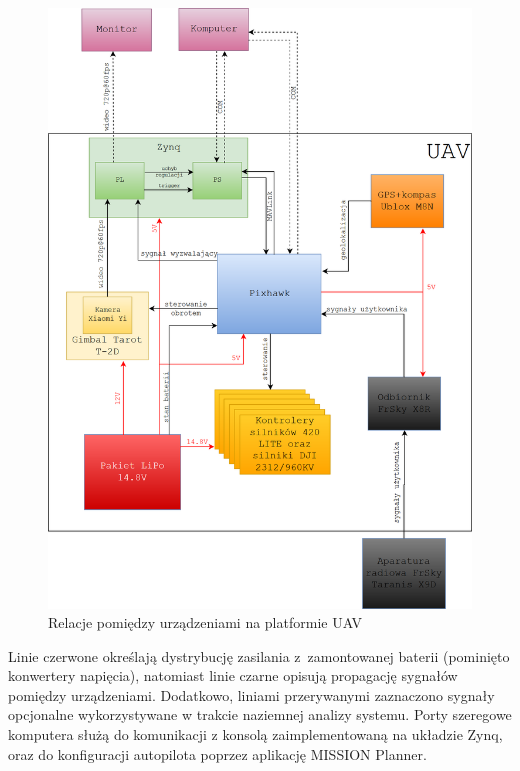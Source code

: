 \begin{figure}[]
	\centering
	\includegraphics[width=15cm]{5_drone_architecture.png}
	\caption{Relacje pomiędzy urządzeniami na platformie UAV}
	\label{fig:architecture}
\end{figure}
Linie czerwone określają dystrybucję zasilania z~zamontowanej baterii (pominięto konwertery napięcia), natomiast linie czarne opisują propagację sygnałów pomiędzy urządzeniami. 
Dodatkowo, liniami przerywanymi zaznaczono sygnały opcjonalne wykorzystywane w trakcie naziemnej analizy systemu. 
Porty szeregowe komputera służą do komunikacji z konsolą zaimplementowaną na układzie Zynq, oraz do konfiguracji autopilota poprzez aplikację MISSION Planner.






